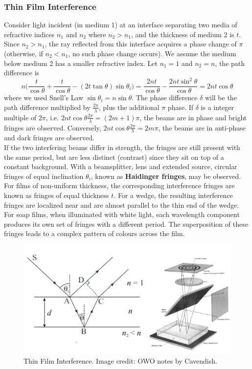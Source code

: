 \documentclass[a4paper]{article}
\begin{document}
\subsubsection*{Thin Film Interference}
\begin{Note}
Consider light incident (in medium 1) at an interface separating two media of refractive indices $n_1$ and $n_2$ where $n_2>n_1$, and the thickness of medium 2 is $t$. Since $n_2>n_1$, the ray reflected from this interface acquires a phase change of $\pi$ (otherwise, if $n_2<n_1$, no such phase change occurs). We assume the medium below medium 2 has a smaller refractive index. Let $n_1=1$ and $n_2=n$, the path difference is
$$n\bigg(\frac{t}{\cos\theta}+\frac{t}{\cos\theta}-(2t\tan\theta)\sin\theta_i\bigg)=\frac{2nt}{\cos\theta}-\frac{2nt\sin^2\theta}{\cos\theta}=2nt\cos\theta$$
where we used Snell's Law $\sin\theta_i=n\sin\theta$. The phase difference $\delta$ will be the path difference multiplied by $\frac{2\pi}{\lambda}$, plus the additional $\pi$ phase. If $\delta$ is a integer multiple of $2\pi$, i.e. $2nt\cos\theta\frac{2\pi}{\lambda}=(2m+1)\pi$, the beams are in phase and bright fringes are observed. Conversely, $2nt\cos\theta\frac{2\pi}{\lambda}=2m\pi$, the beams are in anti-phase and dark fringes are observed. \\[5pt]
If the two interfering beams differ in strength, the fringes are still present with the same period, but are less distinct (contrast) since they sit on top of a constant background. With a beamsplitter, lens and extended source, circular fringes of equal inclination $\theta_i$, known as \textbf{Haidinger fringes}, may be observed.\\[5pt]
For films of non-uniform thickness, the corresponding interference fringes are known as fringes of equal thickness $t$. For a wedge, the resulting interference fringes are localized near and are almost parallel to the thin end of the wedge. For soap films, when illuminated with white light, each wavelength component produces its own set of fringes with a different period. The superposition of these fringes leads to a complex pattern of colours across the film.
\end{Note}
\newpage
\begin{figure}[H]
    \centering
    \includegraphics[scale=0.95]{thinfilm.PNG}
    \caption{Thin Film Interference. Image credit: OWO notes by Cavendish.}
\end{figure}
\end{document}
